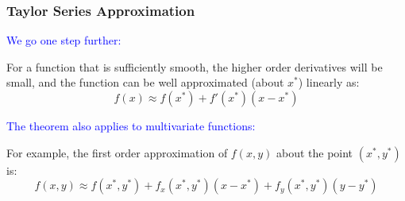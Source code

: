 \documentclass[10pt, handout]{beamer}
\begin{document}










\begin{frame}

\frametitle{Taylor Series Approximation} \vskip 0.1in

\textcolor{blue}{We go one step further:}\vskip0.05in

For a function that is sufficiently smooth, the higher order derivatives will be small, and the function can be well approximated (about $x^*$) linearly as:
\begin{equation}
f(x) \approx f(x^*) + f'(x^*)(x - x^*)
\end{equation}

\vskip0.1in
\pause

\textcolor{blue}{The theorem also applies to multivariate functions:}\vskip0.05in

\noindent For example, the first order approximation of $f(x,y)$ about the point $(x^*,y^*)$ is:
\begin{equation}
f(x,y) \approx f(x^*,y^*) + f_{x}(x^*,y^*)(x - x^*) + f_{y}(x^*,y^*)(y - y^*)
\end{equation}

\end{frame}
\end{document}

